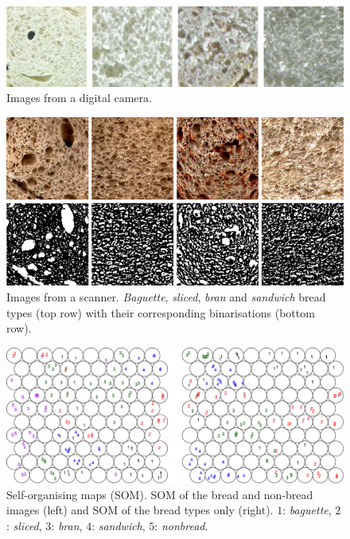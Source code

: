 \documentclass[spanish,a4paper,11pt,oneside,links]{report}
\begin{document}
\begin{figure}[h!]
\centering
\includegraphics{pancamara}
\caption{Images from a digital camera.}
\label{fig:camera}
\end{figure}

\begin{figure}[h!]
\centering
\includegraphics{binarizaciones}
\caption{Images from a scanner. {\em Baguette}, {\em sliced}, {\em bran} and {\em sandwich} bread types (top row) with their corresponding binarisations (bottom row).}
\label{fig:bread}
\end{figure}

\begin{figure}[h!]
\begin{centering}
\includegraphics{SOM}
\caption{Self-organising maps (SOM). SOM of the bread and non-bread images (left) and SOM of the bread types only (right). $1$: {\em baguette}, $2$: {\em sliced}, $3$: {\em bran}, $4$: {\em sandwich}, $5$: {\em nonbread}.}
\label{fig:somfractal}
\end{centering}
\end{figure}
\end{document}
